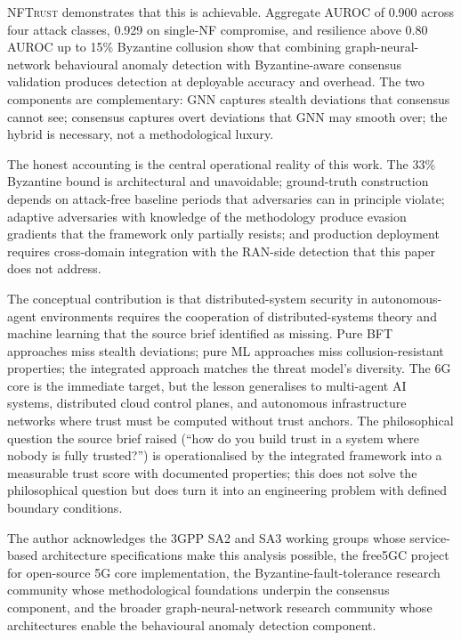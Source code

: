 \documentclass[sigconf,nonacm]{acmart}
\begin{document}
\textsc{NFTrust} demonstrates that this is achievable.
Aggregate AUROC of 0.900 across four attack classes, 0.929 on
single-NF compromise, and resilience above 0.80 AUROC up to 15\%
Byzantine collusion show that combining graph-neural-network
behavioural anomaly detection with Byzantine-aware consensus
validation produces detection at deployable accuracy and
overhead. The two components are complementary: GNN captures
stealth deviations that consensus cannot see; consensus captures
overt deviations that GNN may smooth over; the hybrid is
necessary, not a methodological luxury.

The honest accounting is the central operational reality of this
work. The 33\% Byzantine bound is architectural and unavoidable;
ground-truth construction depends on attack-free baseline
periods that adversaries can in principle violate; adaptive
adversaries with knowledge of the methodology produce evasion
gradients that the framework only partially resists; and
production deployment requires cross-domain integration with the
RAN-side detection that this paper does not address.

The conceptual contribution is that distributed-system security
in autonomous-agent environments requires the cooperation of
distributed-systems theory and machine learning that the source
brief identified as missing. Pure BFT approaches miss stealth
deviations; pure ML approaches miss collusion-resistant
properties; the integrated approach matches the threat model's
diversity. The 6G core is the immediate target, but the lesson
generalises to multi-agent AI systems, distributed cloud
control planes, and autonomous infrastructure networks where
trust must be computed without trust anchors. The philosophical
question the source brief raised (``how do you build trust in a
system where nobody is fully trusted?'') is operationalised by
the integrated framework into a measurable trust score with
documented properties; this does not solve the philosophical
question but does turn it into an engineering problem with
defined boundary conditions.

\begin{acks}
The author acknowledges the 3GPP SA2 and SA3 working groups whose
service-based architecture specifications make this analysis
possible, the free5GC project for open-source 5G core
implementation, the Byzantine-fault-tolerance research community
whose methodological foundations underpin the consensus component,
and the broader graph-neural-network research community whose
architectures enable the behavioural anomaly detection component.
\end{acks}
\end{document}
